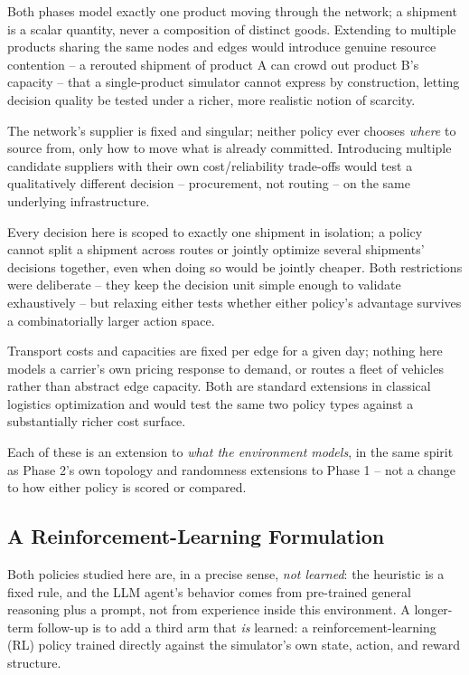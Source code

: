 \documentclass[10pt,twocolumn]{article}
\begin{document}
\begin{description}[leftmargin=1.2em,style=unboxed]
\item[Multiple products.] Both phases model exactly one product moving through the network; a shipment is a scalar quantity, never a composition of distinct goods. Extending to multiple products sharing the same nodes and edges would introduce genuine resource contention -- a rerouted shipment of product A can crowd out product B's capacity -- that a single-product simulator cannot express by construction, letting decision quality be tested under a richer, more realistic notion of scarcity.
\item[Supplier selection and procurement.] The network's supplier is fixed and singular; neither policy ever chooses \emph{where} to source from, only how to move what is already committed. Introducing multiple candidate suppliers with their own cost/reliability trade-offs would test a qualitatively different decision -- procurement, not routing -- on the same underlying infrastructure.
\item[Shipment splitting and joint multi-shipment optimization.] Every decision here is scoped to exactly one shipment in isolation; a policy cannot split a shipment across routes or jointly optimize several shipments' decisions together, even when doing so would be jointly cheaper. Both restrictions were deliberate -- they keep the decision unit simple enough to validate exhaustively -- but relaxing either tests whether either policy's advantage survives a combinatorially larger action space.
\item[Dynamic pricing and fleet-level routing.] Transport costs and capacities are fixed per edge for a given day; nothing here models a carrier's own pricing response to demand, or routes a fleet of vehicles rather than abstract edge capacity. Both are standard extensions in classical logistics optimization and would test the same two policy types against a substantially richer cost surface.
\end{description}

Each of these is an extension to \emph{what the environment models}, in the same spirit as Phase 2's own topology and randomness extensions to Phase 1 -- not a change to how either policy is scored or compared.

\subsection{A Reinforcement-Learning Formulation}
\label{sec:rl}
Both policies studied here are, in a precise sense, \emph{not learned}: the heuristic is a fixed rule, and the LLM agent's behavior comes from pre-trained general reasoning plus a prompt, not from experience inside this environment. A longer-term follow-up is to add a third arm that \emph{is} learned: a reinforcement-learning (RL) policy trained directly against the simulator's own state, action, and reward structure.
\end{document}
